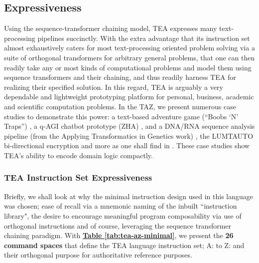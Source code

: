 \documentclass[acmtoplas]{acmart}
\begin{document}
\subsection{Expressiveness}
Using the sequence-transformer chaining model, TEA expresses many text-processing pipelines succinctly. With the extra advantage that its instruction set almost exhaustively caters for most text-processing oriented problem solving via a suite of orthogonal transformers for arbitrary general problems, that one can then readily take any or most kinds of computational problems and model them using sequence transformers and their chaining, and thus readily harness TEA for realizing their specified solution. In this regard, TEA is arguably a very dependable and lightweight prototyping platform for personal, business, academic and scientific computation problems. In the TAZ, we present numerous case studies to demonstrate this power: a text-based adventure game (``Boobs `N' Traps'') \cite{lutalo_2025_rpg}, a q-AGI chatbot prototype (ZHA) \cite{lutalo2025unraveling}, and a DNA/RNA sequence analysis pipeline (from the Applying Transformatics in Genetics work) \cite{lutalo_2025_trans_genetics}, the LUMTAUTO bi-directional encryption \cite{lutalo_2025_grimlumtauto} and more as one shall find in \cite{Lutalo2024TEATAZ}. These case studies show TEA's ability to encode domain logic compactly.

\subsubsection{TEA Instruction Set Expressiveness}

Briefly, we shall look at why the minimal instruction design used in this language was chosen; ease of recall via a mnemonic naming of the inbuilt ``instruction library", the desire to encourage meaningful program composability via use of orthogonal instructions and of course, leveraging the sequence transformer chaining paradigm. With \textbf{\hyperref[tab:tea-az-minimal]{Table \ref{tab:tea-az-minimal}}}, we present the \textbf{26 command spaces} that define the TEA language instruction set; A: to Z: and their orthogonal purpose for authoritative reference purposes.
\end{document}
